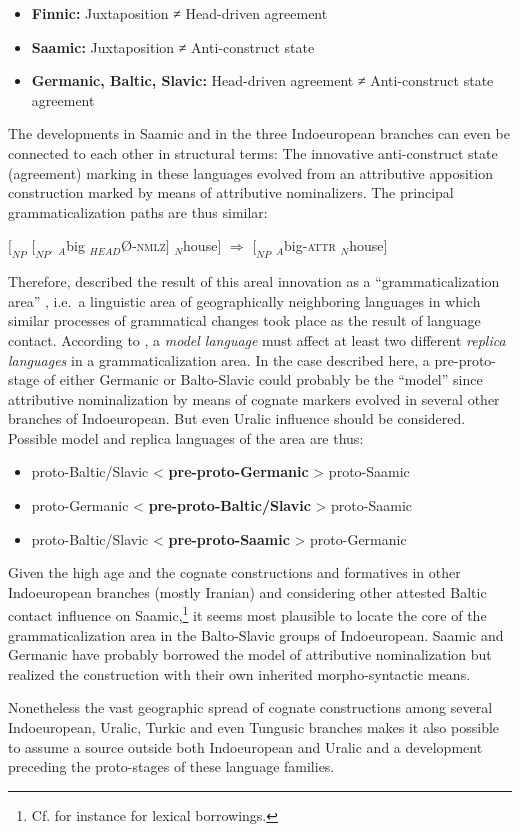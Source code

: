 \begin{itemize}
\item	\textbf{Finnic:}
\subitem Juxtaposition ≠ Head-driven agreement
\item	\textbf{Saamic:}
\subitem Juxtaposition ≠ Anti-construct state
\item	\textbf{Germanic, Baltic, Slavic:}
\subitem Head-driven agreement ≠ Anti-construct state agreement
\end{itemize}
The developments in Saamic and in the three Indoeuropean branches can even be connected to each other in structural terms: The innovative anti-construct state (agreement) marking in these languages evolved from an attributive apposition construction marked by means of attributive nominalizers. The principal grammaticalization paths are thus similar:
\begin{exe}
\ex $[_{NP}$ $[_{NP'}$ $_{A}$big $_{HEAD}$Ø-\textsc{nmlz}$]$ $_{N}$house$]$ $\Rightarrow$ $[_{NP}$ $_{A}$big-\textsc{attr} $_{N}$house$]$
\end{exe}
Therefore, \citet[271]{riesler2006a} described the result of this areal innovation as a “grammaticalization area” \citep{heine-etal2005}, i.e.~a linguistic area of geographically neighboring languages in which similar processes of grammatical changes took place as the result of language contact. According to \citet{heine-etal2005}, a \textit{model language} must affect at least two different \textit{replica languages} in a grammaticalization area. In the case described here, a pre-proto-stage of either Germanic or Balto-Slavic could probably be the “model” since attributive nominalization by means of cognate markers evolved in several other branches of Indoeuropean. But even Uralic influence should be considered. Possible model and replica languages of the area are thus:
\begin{itemize}
\item	\begin{center}proto-Baltic/Slavic < \textbf{pre-proto-Germanic} > proto-Saamic\end{center}
\item	\begin{center}proto-Germanic < \textbf{pre-proto-Baltic/Slavic} > proto-Saamic\end{center}
\item \begin{center}proto-Baltic/Slavic < \textbf{pre-proto-Saamic} > proto-Germanic\end{center}
\end{itemize}
Given the high age and the cognate constructions and formatives in other Indoeuropean branches (mostly Iranian) and considering other attested Baltic contact influence on Saamic,\footnote{Cf. for instance \citealt{riesler2009} for lexical borrowings.} it seems most plausible to locate the core of the grammaticalization area in the Balto-Slavic groups of Indoeuropean. Saamic and Germanic have probably borrowed the model of attributive nominalization but realized the construction with their own inherited morpho-syntactic means.

Nonetheless the vast geographic spread of cognate constructions among several Indoeuropean, Uralic, Turkic and even Tungusic branches makes it also possible to assume a source outside both Indoeuropean and Uralic and a development preceding the proto-stages of these language families.
